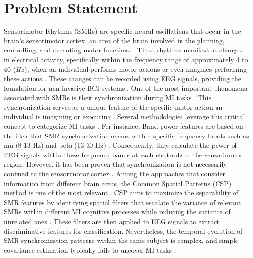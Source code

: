 \section{Problem Statement}

Sensorimotor Rhythms (SMRs) are specific neural oscillations that occur in the brain's sensorimotor cortex, an area of the brain involved in the planning, controlling, and executing motor functions \cite{leeuwis2021functional}. These rhythms manifest as changes in electrical activity, specifically within the frequency range of approximately 4 to 40 ($Hz$), when an individual performs motor actions or even imagines performing these actions \cite{cattai2021phase}. These changes can be recorded using EEG signals, providing the foundation for non-invasive BCI systems \cite{altaheri2023deep}. One of the most important phenomena associated with SMRs is their synchronization during MI tasks \cite{belwafi2020effective}. This synchronization serves as a unique feature of the specific motor action an individual is imagining or executing \cite{zapala2020effects}. Several methodologies leverage this critical concept to categorize MI tasks \cite{brusini2021systematic}. For instance, Band-power features are based on the idea that SMR synchronization occurs within specific frequency bands such as mu (8-13 Hz) and beta (13-30 Hz) \cite{luo2020motor}. Consequently, they calculate the power of EEG signals within these frequency bands at each electrode at the sensorimotor region. However, it has been proven that synchronization is not necessarily confined to the sensorimotor cortex \cite{singh2021comprehensive}. Among the approaches that consider information from different brain areas, the Common Spatial Patterns (CSP) method is one of the most relevant \cite{yang2021multi}. CSP aims to maximize the separability of SMR features by identifying spatial filters that escalate the variance of relevant SMRs within different MI cognitive processes while reducing the variance of unrelated ones \cite{gaur2021sliding}. These filters are then applied to EEG signals to extract discriminative features for classification. Nevertheless, the temporal evolution of SMR synchronization patterns within the same subject is complex, and simple covariance estimation typically fails to uncover MI tasks \cite{darvish2021correlation}. 

